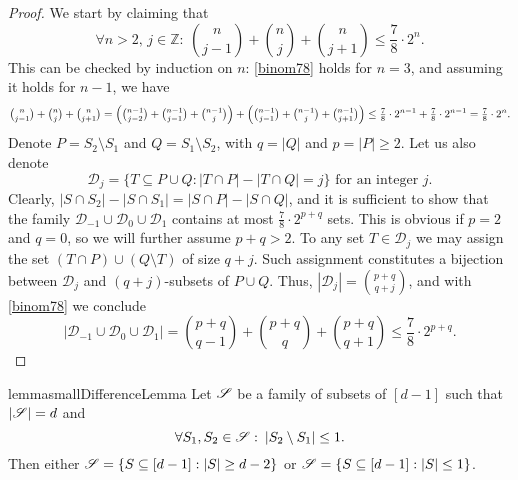 \begin{proof}
    We start by claiming that
    \begin{equation}\label{binom78}
        \forall n > 2,\,j\in \mathbb{Z}:\: \binom{n}{j-1}+\binom{n}{j}+\binom{n}{j+1} \leq \frac{7}{8}\cdot 2^{n}.
     \end{equation}
    This can be checked by induction on $n$: \eqref{binom78} holds for $n=3$, and assuming it holds for $n-1$, we have
    \[
        \tbinom{n}{j-1}+\tbinom{n}{j}+\tbinom{n}{j+1} = \Bigl(\tbinom{n-1}{j-2}+\tbinom{n-1}{j-1}+\tbinom{n-1}{j}\Bigr) + \Bigl(\tbinom{n-1}{j-1}+\tbinom{n-1}{j}+\tbinom{n-1}{j+1}\Bigr) \leq \tfrac{7}{8}\cdot 2^{n-1} + \tfrac{7}{8}\cdot 2^{n-1} = \tfrac{7}{8}\cdot 2^n.
    \]
    Denote $P = S_2 \setminus S_1$ and $Q = S_1 \setminus S_2$, with $q=|Q|$ and $p=|P|\geq 2$. Let us also denote 
    \[
        \mathcal{D}_j = \{T\subseteq P\cup Q: |T\cap P|-|T\cap Q|=j\}\text{ for an integer }j.
    \] 
    Clearly, $|S\cap S_2| - |S\cap S_1| = |S\cap P| - |S\cap Q|$, and it is sufficient to show that the family $\mathcal{D}_{-1}\cup \mathcal{D}_{0}\cup \mathcal{D}_{1}$ contains at most $\frac{7}{8}\cdot 2^{p+q}$ sets. This is obvious if $p=2$ and $q=0$, so we will further assume $p+q>2$. To any set $T\in \mathcal{D}_j$ we may assign the set $(T\cap P)\cup(Q\setminus T)$ of size $q+j$. Such assignment constitutes a bijection between $\mathcal{D}_j$ and $(q+j)$-subsets of $P\cup Q$. Thus, $|\mathcal{D}_j|=\binom{p+q}{q+j}$, and with \eqref{binom78} we conclude
    \[
        |\mathcal{D}_{-1}\cup \mathcal{D}_{0}\cup \mathcal{D}_{1}| = \binom{p+q}{q-1}+\binom{p+q}{q}+\binom{p+q}{q+1}\leq \frac{7}{8}\cdot 2^{p+q}.
    \]
\end{proof}

\begin{restatable}[]{lemma}{smallDifferenceLemma}\label{smallDifferenceLemma}
    Let ${\mathscr{S}}$ be a family of subsets of $[d-1]$ such that $|{\mathscr{S}}| = d$ and 
    \[
        \forall S_1, S_2 \in {\mathscr{S}}:\:|S_2\setminus S_1|\leq 1.
    \]
    Then either ${\mathscr{S}} = \{S\subseteq[d-1]: |S| \geq d-2\}$ or ${\mathscr{S}} = \{S\subseteq[d-1]: |S| \leq 1\}$.
\end{restatable}

